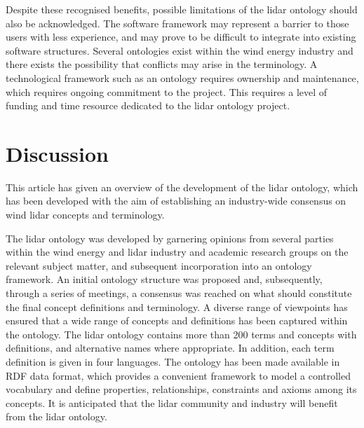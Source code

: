 \documentclass[remotesensing,article,submit,pdftex,moreauthors]{Definitions/mdpi}
\begin{document}
Despite these recognised benefits, possible limitations of the lidar ontology should also be acknowledged.
The software framework may represent a barrier to those users with less experience, and may prove to be difficult to integrate into existing software structures.
Several ontologies exist within the wind energy industry and there exists the possibility that conflicts may arise in the terminology.
A technological framework such as an ontology requires ownership and maintenance, which requires ongoing commitment to the project.
This requires a level of funding and time resource dedicated to the lidar ontology project. 





\section{Discussion}
\label{sec:Discussion}
This article has given an overview of the development of the lidar ontology, which has been developed with the aim of establishing an industry-wide consensus on wind lidar concepts and terminology.

The lidar ontology was developed by garnering opinions from several parties within the wind energy and lidar industry and academic research groups on the relevant subject matter, and subsequent incorporation into an ontology framework. 
An initial ontology structure was proposed and, subsequently, through a series of meetings, a consensus was reached on what should constitute the final concept definitions and terminology.
A diverse range of viewpoints has ensured that a wide range of concepts and definitions has been captured within the ontology. 
The lidar ontology contains more than 200 terms and concepts with definitions, and alternative names where appropriate. In addition, each term definition is given in four languages. 
The ontology has been made available in RDF data format, which provides a convenient framework to model a controlled vocabulary and define properties, relationships, constraints and axioms among its concepts.
It is anticipated that the lidar community and industry will benefit from the lidar ontology.
\end{document}
